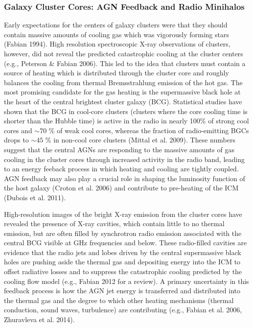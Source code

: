 \documentclass[11pt]{article}
\begin{document}
\subsubsection{Galaxy Cluster Cores: AGN Feedback and Radio Minihalos}

Early expectations for the centers of galaxy clusters were that they should contain 
massive amounts of cooling gas which was vigorously forming stars (Fabian 1994). 
High resolution spectroscopic X-ray observations of clusters, however, did not reveal 
the predicted catastrophic cooling at the cluster centers (e.g., Peterson \& Fabian 2006). 
This led to the idea that clusters must contain a source of heating which is distributed 
through the cluster core and roughly balances the cooling from thermal Bremsstrahlung 
emission of the hot gas. The most promising candidate for the gas heating is the 
supermassive black hole at the heart of the central brightest cluster galaxy (BCG). 
Statistical studies have shown that the BCG in cool-core clusters (clusters where 
the core cooling time is shorter than the Hubble time) is active in the radio in nearly 
100\% of strong cool cores and $\sim 70$ \% of weak cool cores, whereas the fraction 
of radio-emitting BGCs drops to $\sim 45$ \% in non-cool core clusters (Mittal et al. 2009). 
These numbers suggest that the central AGNs are responding to the massive amounts of 
gas cooling in the cluster cores through increased activity in the radio band, leading to 
an energy feeback process in which heating and cooling are tightly coupled. 
AGN feedback may also play a crucial role in shaping the luminosity function of the 
host galaxy (Croton et al. 2006) and contribute to pre-heating of the ICM (Dubois et al. 2011). 

High-resolution images of the bright X-ray emission from the cluster cores have revealed 
the presence of X-ray cavities, which contain little to no thermal emission, but are 
often filled by synchrotron radio emission associated with the central BCG 
visible at GHz frequencies and below. These radio-filled cavities are evidence that the radio jets and 
lobes driven by the central supermassive black holes are pushing aside the thermal gas 
and depositing energy into the ICM to offset radiative losses and to suppress the 
catastrophic cooling predicted by the cooling flow model (e.g., Fabian 2012  
for a review). A primary uncertainty in this feedback process is how the AGN jet
energy is transferred and distributed into the thermal gas and the degree to which 
other heating mechanisms (thermal conduction, sound waves, turbulence) are contributing 
(e.g., Fabian et al. 2006, Zhuravleva et al. 2014). 
\end{document}
